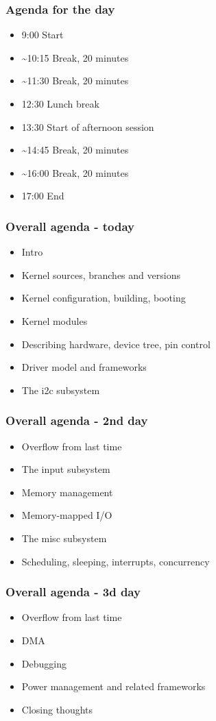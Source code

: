 \begin{frame}
\frametitle{Agenda for the day}
\begin{itemize}
\item 9:00 Start
\item \textasciitilde{}10:15 Break, 20 minutes
\item \textasciitilde{}11:30 Break, 20 minutes
\item 12:30 Lunch break
\item 13:30 Start of afternoon session
\item \textasciitilde{}14:45 Break, 20 minutes
\item \textasciitilde{}16:00 Break, 20 minutes
\item 17:00 End
\end{itemize}
\end{frame}

\begin{frame}
\frametitle{Overall agenda - today}
\begin{itemize}
\item Intro
\item Kernel sources, branches and versions
\item Kernel configuration, building, booting
\item Kernel modules
\item Describing hardware, device tree, pin control
\item Driver model and frameworks
\item The i2c subsystem
\end{itemize}
\end{frame}

\begin{frame}
\frametitle{Overall agenda - 2nd day}
\begin{itemize}
\item Overflow from last time
\item The input subsystem
\item Memory management
\item Memory-mapped I/O
\item The misc subsystem
\item Scheduling, sleeping, interrupts, concurrency
\end{itemize}
\end{frame}

\begin{frame}
\frametitle{Overall agenda - 3d day}
\begin{itemize}
\item Overflow from last time
\item DMA
\item Debugging
\item Power management and related frameworks
\item Closing thoughts
\end{itemize}
\end{frame}

